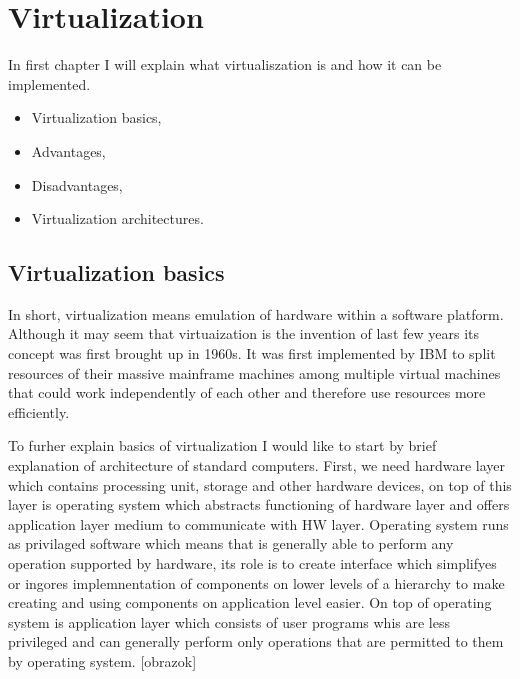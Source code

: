 
\chapter{Virtualization}
In first chapter I will explain what virtualiszation is and how it can be implemented.
\begin{itemize}
\item Virtualization basics,
\item Advantages,
\item Disadvantages,
\item Virtualization architectures.
\end{itemize}

\section{Virtualization basics}
In short, virtualization means emulation of hardware within a software platform. Although it may seem that virtuaization is the invention of last few years its concept was first brought up in 1960s. It was first implemented by IBM to split resources of their massive mainframe machines among multiple virtual machines that could work independently of each other and therefore use resources more efficiently.

To furher explain basics of virtualization I would like to start by brief explanation of architecture of standard computers. First, we need hardware layer which contains processing unit, storage and other hardware devices, on top of this layer is operating system which abstracts functioning of hardware layer and offers application layer medium to communicate with HW layer. Operating system runs as privilaged software which means that is generally able to perform any operation supported by hardware, its role is to create interface which simplifyes or ingores implemnentation of components on lower levels of a hierarchy to make creating and using components on application level easier. On top of operating system is application layer which consists of user programs whis are less privileged and can generally perform only operations that are permitted to them by operating system. [obrazok]

